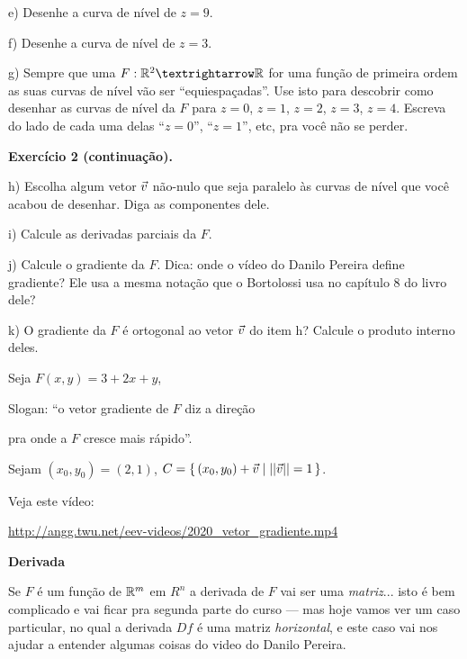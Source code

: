 \documentclass[oneside,12pt]{article}
\begin{document}
e) Desenhe a curva de nível de $z=9$.

f) Desenhe a curva de nível de $z=3$.

g) Sempre que uma $F:\R^2 → \R$ for uma função de primeira ordem as
suas curvas de nível vão ser ``equiespaçadas''. Use isto para
descobrir como desenhar as curvas de nível da $F$ para $z=0$, $z=1$,
$z=2$, $z=3$, $z=4$. Escreva do lado de cada uma delas ``$z=0$'',
``$z=1$'', etc, pra você não se perder.

\newpage

{\bf Exercício 2 (continuação).}

\ssk

h) Escolha algum vetor ${\vec v}$ não-nulo que seja paralelo às curvas de
nível que você acabou de desenhar. Diga as componentes dele.

i) Calcule as derivadas parciais da $F$.

j) Calcule o gradiente da $F$. Dica: onde o vídeo do Danilo Pereira
define gradiente? Ele usa a mesma notação que o Bortolossi usa no
capítulo 8 do livro dele?

k) O gradiente da $F$ é ortogonal ao vetor ${\vec v}$ do item h? Calcule o
produto interno deles.


\newpage

Seja $F(x,y) = 3 + 2x +y$,

Slogan: ``o vetor gradiente de $F$ diz a direção

pra onde a $F$ cresce mais rápido''.

Sejam $(x_0,y_0) = (2,1)$, $C = \{\,(x_0,y_0) + {\vec v}\;|\;||{\vec v}||=1\,\}$.

Veja este vídeo:

\ssk

\url{http://angg.twu.net/eev-videos/2020_vetor_gradiente.mp4} 


\newpage


{\bf Derivada}

\ssk

Se $F$ é um função de $\mathbb{R}^m$ em $R^n$ a derivada de $F$ vai ser uma
{\sl matriz}... isto é bem complicado e vai ficar pra segunda parte do
curso --- mas hoje vamos ver um caso particular, no qual a derivada
$Df$ é uma matriz {\sl horizontal}, e este caso vai nos ajudar a
entender algumas coisas do video do Danilo Pereira.
\end{document}
